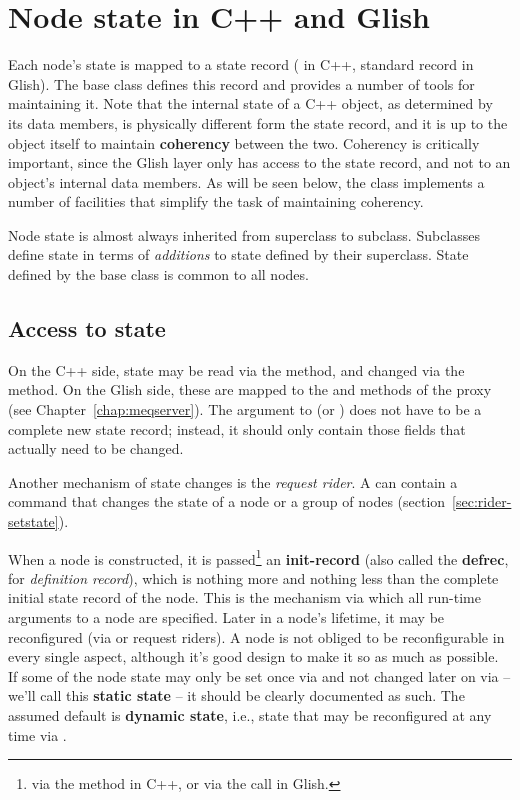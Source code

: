 \section{Node state in C++ and Glish}
  
  Each node's state is mapped to a state record ( in C++,
  standard record in Glish). The base  class defines this record and
  provides a number of tools for maintaining it. Note that the internal state
  of a C++ object, as determined by its data members, is physically different 
  form the state record, and it is up to the object itself to maintain {\bf
  coherency} between the two. Coherency is critically important, since the
  Glish layer only has access to the state record, and not to an object's
  internal data members. As will be seen below, the  class implements
  a number of facilities that simplify the task of maintaining coherency.
  
  Node state is almost always inherited from superclass to subclass. Subclasses
  define state in terms of {\em additions\/} to state defined by their
  superclass. State defined by the base  class is common to all nodes.

\subsection{Access to state}

  On the C++ side, state may be read via the  method, and
  changed via the  method. On the Glish side, these are
  mapped to the  and  methods of the
   proxy (see Chapter~\ref{chap:meqserver}). The argument to
   (or ) does not have to be a complete new
  state record; instead, it should only contain those fields that actually need
  to be changed. 
  
  Another mechanism of state changes is the {\em request rider}. A 
  can contain a command that changes the state of a node or a group of nodes
  (section~\ref{sec:rider-setstate}).

  When a node is constructed, it is passed\footnote{ via the  method
  in C++, or via the  call in  Glish.} an {\bf init-record}
  (also called the {\bf defrec}, for {\em definition record\/}), which is
  nothing more and nothing less than the complete initial state record of the
  node. This is the mechanism via which all run-time arguments to a node are
  specified. Later in a node's lifetime, it may be reconfigured (via
   or request riders). A node is not obliged to be
  reconfigurable in every single aspect, although it's good design to make it
  so as much as possible. If some of the node state may only be set once via
   and not changed later on via  -- we'll call this
  {\bf static state} -- it should be clearly documented as such. The assumed
  default is {\bf  dynamic state}, i.e., state that may be reconfigured at any
  time via .
  

